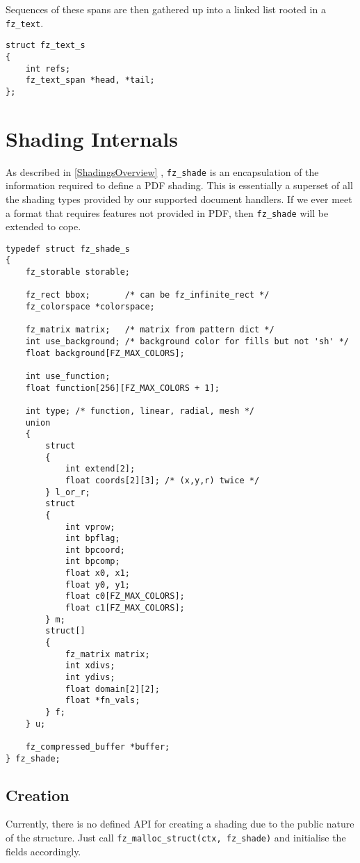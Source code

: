 \documentclass[oneside]{book}
\newcommand{\rjwref}[1] {\autoref{#1} \nameref{#1}}
\begin{document}
Sequences of these spans are then gathered up into a linked list rooted in a \texttt{fz\_text}.

\begin{lstlisting}
struct fz_text_s
{
	int refs;
	fz_text_span *head, *tail;
};
\end{lstlisting}


\chapter{Shading Internals}
\label{Shadings}

As described in \rjwref{ShadingsOverview}, \texttt{fz\_shade} is an encapsulation of the information required to define a PDF shading. This is essentially a superset of all the shading types provided by our supported document handlers. If we ever meet a format that requires features not provided in PDF, then \texttt{fz\_shade} will be extended to cope.

\begin{lstlisting}
typedef struct fz_shade_s
{
	fz_storable storable;

	fz_rect bbox;		/* can be fz_infinite_rect */
	fz_colorspace *colorspace;

	fz_matrix matrix;	/* matrix from pattern dict */
	int use_background;	/* background color for fills but not 'sh' */
	float background[FZ_MAX_COLORS];

	int use_function;
	float function[256][FZ_MAX_COLORS + 1];

	int type; /* function, linear, radial, mesh */
	union
	{
		struct
		{
			int extend[2];
			float coords[2][3]; /* (x,y,r) twice */
		} l_or_r;
		struct
		{
			int vprow;
			int bpflag;
			int bpcoord;
			int bpcomp;
			float x0, x1;
			float y0, y1;
			float c0[FZ_MAX_COLORS];
			float c1[FZ_MAX_COLORS];
		} m;
		struct[]
		{
			fz_matrix matrix;
			int xdivs;
			int ydivs;
			float domain[2][2];
			float *fn_vals;
		} f;
	} u;

	fz_compressed_buffer *buffer;
} fz_shade;
\end{lstlisting}

\section{Creation}

Currently, there is no defined API for creating a shading due to the public nature of the structure. Just call \texttt{fz\_malloc\_struct(ctx, fz\_shade)} and initialise the fields accordingly.
\end{document}
